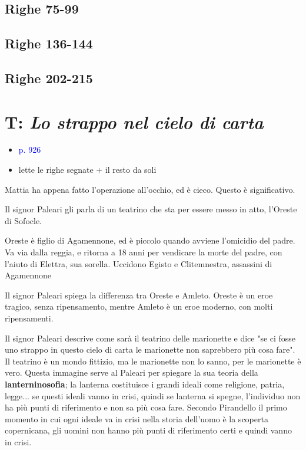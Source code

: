 \documentclass[a4paper, twoside, titlepage]{book}
\newcommand{\elenco}[1]{%
\begin{itemize}
#1
\end{itemize}}
\renewcommand{\emph}[1]{\textcolor{blue}{#1}}
\begin{document}
\subsection*{Righe 75-99}

\subsection*{Righe 136-144}

\subsection*{Righe 202-215}

\section{T: \textit{Lo strappo nel cielo di carta}}
\elenco{\item \emph{p. 926}
\item lette le righe segnate + il resto da soli}

Mattia ha appena fatto l’operazione all’occhio, ed è cieco. Questo è significativo.

Il signor Paleari gli parla di un teatrino che sta per essere messo in atto, l’Oreste di Sofocle.

Oreste è figlio di Agamennone, ed è piccolo quando avviene l’omicidio del padre. Va via dalla reggia, e ritorna a 18 anni per vendicare la morte del padre, con l’aiuto di Elettra, sua sorella. Uccidono Egisto e Clitemnestra, assassini di Agamennone

Il signor Paleari spiega la differenza tra Oreste e Amleto. Oreste è un eroe tragico, senza ripensamento, mentre Amleto è un eroe moderno, con molti ripensamenti.

Il signor Paleari descrive come sarà il teatrino delle marionette e dice "se ci fosse uno strappo in questo cielo di carta le marionette non saprebbero più cosa fare". Il teatrino è un mondo fittizio,  ma le marionette non lo sanno, per le marionette è vero.
Questa immagine serve al Paleari per spiegare la sua teoria della \textbf{lanterninosofia}; la lanterna costituisce i grandi ideali come religione, patria, legge... se questi ideali vanno in crisi, quindi se lanterna si spegne, l'individuo non ha più punti di riferimento e non sa più cosa fare.
Secondo Pirandello il primo momento in cui ogni ideale va in crisi nella storia dell'uomo è la scoperta copernicana, gli uomini non hanno più punti di riferimento certi e quindi vanno in crisi.
\end{document}
